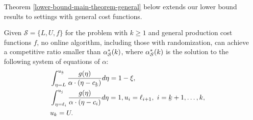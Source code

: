 Theorem \ref{lower-bound-main-theorem-general} below extends our lower bound results to settings with general cost functions.
\begin{theorem}
    \label{lower-bound-main-theorem-general}
Given $\mathcal{S} = \{L, U, f\} $ for the \OSDoS problem with $k \ge 1$ and general production cost functions $ f $, no online algorithm, including those with randomization, can achieve a competitive ratio smaller than $\alpha_{\mathcal{S}}^*(k)$, where $\alpha_{\mathcal{S}}^*(k)$ is the solution to the following system of equations of $\alpha$:
\begin{align}
        \label{lower-bound-U-h-computation-general}
     &  \int_{\eta = L}^{u_{\ubar{k}}} \frac{g(\eta)}{\alpha \cdot (\eta-c_{\ubar{k}})} d\eta = 1 - \xi, \\
\label{lower-bound-other-U-computation-general}
     & \int_{\eta = \ell_{i}}^{u_{\ubar{i}}} \frac{g(\eta)}{\alpha \cdot (\eta-c_{i})}  d\eta = 1, u_{i} = \ell_{i+1}, \ i = \ubar{k}+1, \dots ,k, \\
        & u_{k} = U.
    \end{align}
\end{theorem}
